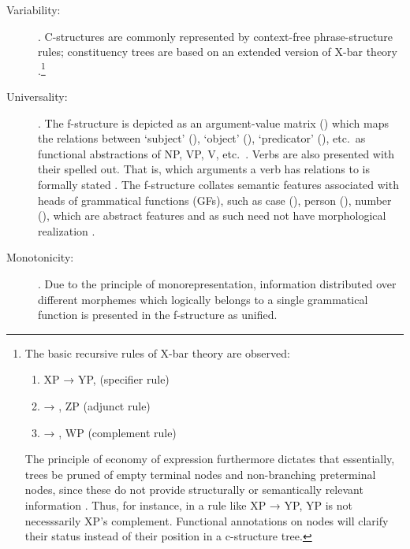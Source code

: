 \begin{description}
\item[Variability:] . 
C-structures are commonly represented by context-free phrase-structure rules; 
constituency trees are based on an extended version of X-bar theory 
\citep[42]{bresnan2016}.\footnote{The basic recursive rules of X-bar theory 
are observed:
\begin{enumerate}[nosep, leftmargin={2\footnotemargin}]
\item XP → YP,  (specifier rule)
\item {} → , ZP (adjunct rule)
\item {} → , WP (complement rule)
\end{enumerate}

The principle of economy of expression furthermore dictates that essentially,
trees be pruned of empty terminal nodes and non-branching preterminal nodes,
since these do not provide structurally or semantically relevant information
\citep[119--128]{bresnan2016}. Thus, for instance, in a rule like XP →
 YP, YP is not necesssarily XP's complement. Functional annotations on
nodes will clarify their status instead of their position in a c-structure
tree.}

\item[Universality:] . The f-structure is depicted
as an argument-value matrix (\Avm{}) which maps the relations between `subject'
(\Subj{}), `object' (\Obj{}), `predicator' (\Pred{}), etc.\ as functional
abstractions of NP, VP, V, etc.\ \citep[42]{bresnan2016}. Verbs are also
presented with their  spelled out. That is, which arguments a
verb has relations to is formally stated \citep[15]{bresnan2016}. The
f-structure collates semantic features associated with heads of grammatical
functions (GFs), such as case (\Case{}), person (\Pers{}), number (\Num{}),
which are abstract features and as such need not have morphological realization
\citep[43]{bresnan2016}.

\item[Monotonicity:] . Due to the principle of monorepresentation, information
distributed over different morphemes which logically belongs to a single
grammatical function is presented in the f-structure as unified.

\end{description}


